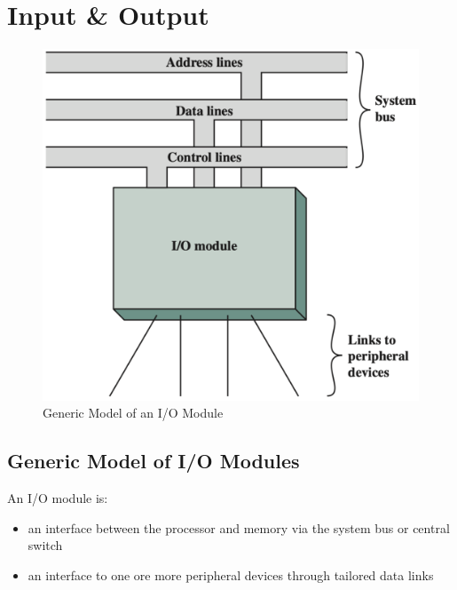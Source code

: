 \section{Input \& Output} \label{sec:input-output}

\begin{multicols}{2}

\begin{figure}[H]
    \centering
    \includegraphics[width=\linewidth]{chaps/input-output/io-module-model.png}
    \caption{Generic Model of an I/O Module}
\end{figure}

\columnbreak

\subsection{Generic Model of I/O Modules}

An I/O module is:
\begin{itemize}
    \item an interface between the processor and memory via the system bus or central switch
    \item an interface to one ore more peripheral devices through tailored data links
\end{itemize}


\end{multicols}
